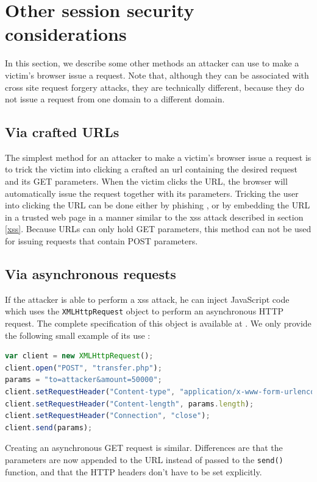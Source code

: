 \section{Other session security considerations}\label{other-browser-requests}

In this section, we describe some other methods an attacker can use to make a victim's browser issue a request. Note that, although they can be associated with cross site request forgery attacks, they are technically different, because they do not issue a request from one domain to a different domain.

\subsection{Via crafted URLs}

The simplest method for an attacker to make a victim's browser issue a request is to trick the victim into clicking a crafted an \gls{url} containing the desired request and its GET parameters. When the victim clicks the URL, the browser will automatically issue the request together with its parameters. Tricking the user into clicking the URL can be done either by phishing \cite{Barth2008}, or by embedding the URL in a trusted web page in a manner similar to the \gls{xss} attack described in section \ref{xss}. Because URLs can only hold GET parameters, this method can not be used for issuing requests that contain POST parameters.

\subsection{Via asynchronous requests}\label{asynch}

If the attacker is able to perform a \gls{xss} attack, he can inject JavaScript code which uses the \texttt{XMLHttpRequest} object to perform an asynchronous HTTP request. The complete specification of this object is available at \cite{Kesteren:09:X}. We only provide the following small example of its use \cite{Binny2010}:
\begin{lstlisting}[language=JavaScript,breaklines=true]
var client = new XMLHttpRequest();
client.open("POST", "transfer.php");
params = "to=attacker&amount=50000";
client.setRequestHeader("Content-type", "application/x-www-form-urlencoded");
client.setRequestHeader("Content-length", params.length);
client.setRequestHeader("Connection", "close");
client.send(params);
\end{lstlisting}
Creating an asynchronous GET request is similar. Differences are that the parameters are now appended to the URL instead of passed to the \texttt{send()} function, and that the HTTP headers don't have to be set explicitly.


